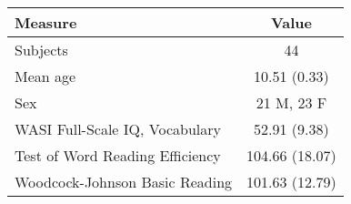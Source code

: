 \begin{tabular}{lc}
\toprule
Measure &   Value \\
\midrule
Subjects                        &              44 \\
Mean age                        &    10.51 (0.33) \\
Sex                             &      21 M, 23 F \\
WASI Full-Scale IQ, Vocabulary  &    52.91 (9.38) \\
Test of Word Reading Efficiency &  104.66 (18.07) \\
Woodcock-Johnson Basic Reading  &  101.63 (12.79) \\
\bottomrule
\end{tabular}